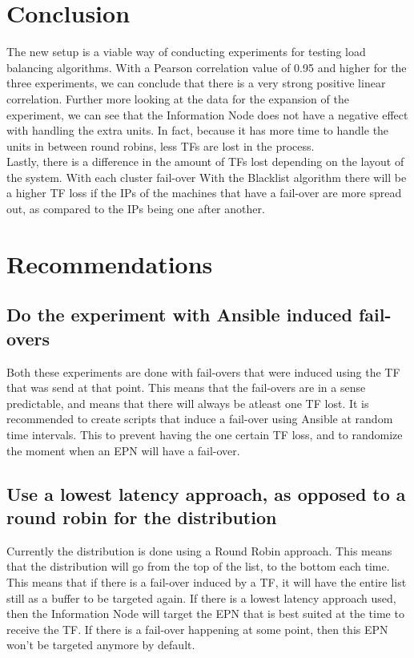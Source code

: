 \section{Conclusion}
The new setup is a viable way of conducting experiments for testing load balancing algorithms. With a Pearson correlation value of 0.95 and higher for the three experiments, we can conclude that there is a very strong positive linear correlation. Further more looking at the data for the expansion of the experiment, we can see that the Information Node does not have a negative effect with handling the extra units. In fact, because it has more time to handle the units in between round robins, less TFs are lost in the process. \\
Lastly, there is a difference in the amount of TFs lost depending on the layout of the system. With each cluster fail-over With the Blacklist algorithm there will be a higher TF loss if the IPs of the machines that have a fail-over are more spread out, as compared to the IPs being one after another. 

\section{Recommendations}
\subsection{Do the experiment with Ansible induced fail-overs}
Both these experiments are done with fail-overs that were induced using the TF that was send at that point. This means that the fail-overs are in a sense predictable, and means that there will always be atleast one TF lost. It is recommended to create scripts that induce a fail-over using Ansible at random time intervals. This to prevent having the one certain TF loss, and to randomize the moment when an EPN will have a fail-over.
\subsection{Use a lowest latency approach, as opposed to a round robin for the distribution}
Currently the distribution is done using a Round Robin approach. This means that the distribution will go from the top of the list, to the bottom each time. This means that if there is a fail-over induced by a TF, it will have the entire list still as a buffer to be targeted again. If there is a lowest latency approach used, then the Information Node will target the EPN that is best suited at the time to receive the TF. If there is a fail-over happening at some point, then this EPN won't be targeted anymore by default.